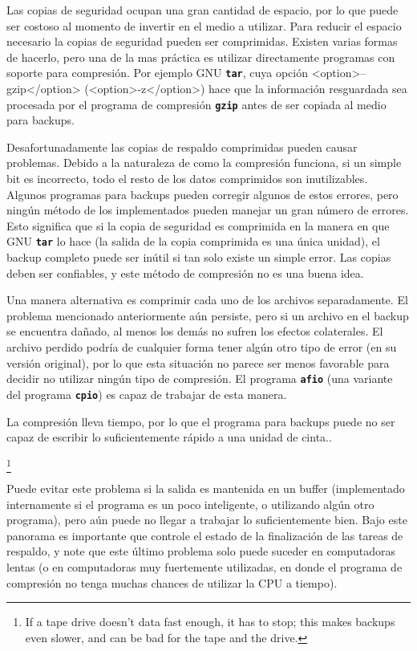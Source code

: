 	

Las copias de seguridad ocupan una gran cantidad de espacio, por lo que
puede ser costoso al momento de invertir en el medio a utilizar.
Para reducir el espacio necesario la copias de seguridad pueden ser comprimidas. Existen varias 
formas de hacerlo, pero una de la mas práctica es utilizar directamente programas con soporte para compresión.
Por ejemplo GNU \texttt{\textbf{tar}}, cuya opción <option>--gzip</option> (<option>-z</option>) 
hace que la información resguardada sea procesada por el programa de compresión 
\texttt{\textbf{gzip}} antes de ser copiada al medio para backups.
	
	

Desafortunadamente las copias de respaldo comprimidas pueden causar 
problemas. Debido a la naturaleza de como la compresión funciona, si un simple 
bit es incorrecto, todo el resto de los datos comprimidos son 
inutilizables. Algunos programas para backups pueden corregir algunos de 
estos errores, pero ningún método de los implementados 
pueden manejar un gran número de errores. Esto significa que si la copia de 
seguridad es comprimida en la manera en que GNU \texttt{\textbf{tar}} lo hace (la salida
de la copia comprimida es una única unidad), el backup completo puede 
ser inútil si tan solo existe un simple error.
Las copias deben ser 
confiables, y este método de compresión no es una buena idea.
	
	

Una manera alternativa es comprimir cada uno de los archivos separadamente. 
El problema mencionado anteriormente aún persiste, pero si un archivo en el backup se 
encuentra dañado, al menos los demás no sufren los efectos colaterales.
El archivo perdido podría de cualquier forma tener algún otro tipo de error (en su versión original), por 
lo que esta situación no parece ser menos favorable para decidir no utilizar ningún tipo de compresión.
El programa \texttt{\textbf{afio}} (una variante del programa \texttt{\textbf{cpio}}) es capaz de trabajar de esta manera.
	
	

La compresión lleva tiempo, por lo que el programa para backups puede 
no ser capaz de escribir lo suficientemente rápido a una unidad de cinta..
	
		\footnote{If a tape drive doesn't data fast enough,
		it has to stop; this makes backups even slower, and can
		be bad for the tape and the drive.}
		

Puede evitar este problema si la
salida es mantenida en un buffer (implementado internamente si el programa es 
un poco inteligente, o utilizando algún otro programa), pero aún puede no llegar a 
trabajar lo suficientemente bien. Bajo este panorama es importante que controle
el estado de la finalización de las tareas de respaldo, y note que este último problema
solo puede suceder en computadoras lentas (o en computadoras muy fuertemente utilizadas,
en donde el programa de compresión no tenga muchas chances de utilizar la CPU a tiempo).






